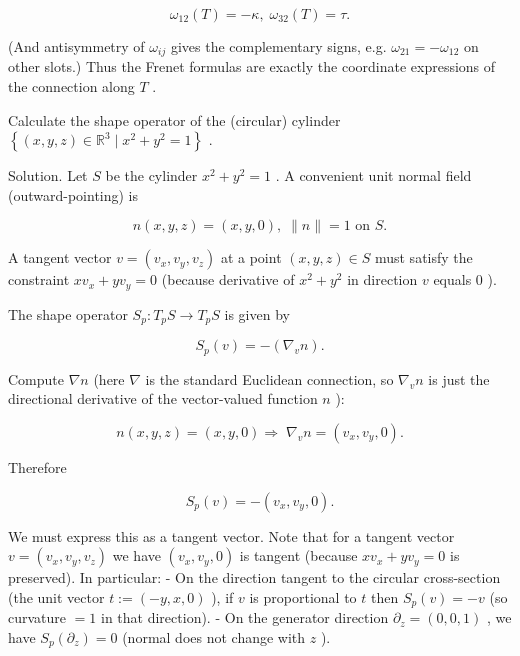 \documentclass[10pt]{article}
\begin{document}
\[
{\omega }_{12}\left( T\right)  =  - \kappa ,\;{\omega }_{32}\left( T\right)  = \tau .
\]

(And antisymmetry of \({\omega }_{ij}\) gives the complementary signs, e.g. \({\omega }_{21} =  - {\omega }_{12}\) on other slots.) Thus the Frenet formulas are exactly the coordinate expressions of the connection along \(T\) .

\begin{problem}[title=PROBLEM 3 (3 POINTS)]
Calculate the shape operator of the (circular) cylinder \(\left\{  {\left( {x,y,z}\right)  \in  {\mathbb{R}}^{3} \mid  {x}^{2} + {y}^{2} = 1}\right\}\) .
\end{problem}

Solution. Let \(S\) be the cylinder \({x}^{2} + {y}^{2} = 1\) . A convenient unit normal field (outward-pointing) is

\[
n\left( {x,y,z}\right)  = \left( {x,y,0}\right) ,\;\parallel n\parallel  = 1\text{ on }S.
\]

A tangent vector \(v = \left( {{v}_{x},{v}_{y},{v}_{z}}\right)\) at a point \(\left( {x,y,z}\right)  \in  S\) must satisfy the constraint \(x{v}_{x} + y{v}_{y} = 0\) (because derivative of \({x}^{2} + {y}^{2}\) in direction \(v\) equals 0 ).

The shape operator \({S}_{p} : {T}_{p}S \rightarrow  {T}_{p}S\) is given by

\[
{S}_{p}\left( v\right)  =  - \left( {{\nabla }_{v}n}\right) .
\]

Compute \(\nabla n\) (here \(\nabla\) is the standard Euclidean connection, so \({\nabla }_{v}n\) is just the directional derivative of the vector-valued function \(n\) ):

\[
n\left( {x,y,z}\right)  = \left( {x,y,0}\right)  \Rightarrow  \;{\nabla }_{v}n = \left( {{v}_{x},{v}_{y},0}\right) .
\]

Therefore

\[
{S}_{p}\left( v\right)  =  - \left( {{v}_{x},{v}_{y},0}\right) .
\]

We must express this as a tangent vector. Note that for a tangent vector \(v = \left( {{v}_{x},{v}_{y},{v}_{z}}\right)\) we have \(\left( {{v}_{x},{v}_{y},0}\right)\) is tangent (because \(x{v}_{x} + y{v}_{y} = 0\) is preserved). In particular: - On the direction tangent to the circular cross-section (the unit vector \(t \mathrel{\text{ := }} \left( {-y,x,0}\right)\) ), if \(v\) is proportional to \(t\) then \({S}_{p}\left( v\right)  =  - v\) (so curvature \(= 1\) in that direction). - On the generator direction \({\partial }_{z} = \left( {0,0,1}\right)\) , we have \({S}_{p}\left( {\partial }_{z}\right)  = 0\) (normal does not change with \(z\) ).
\end{document}
